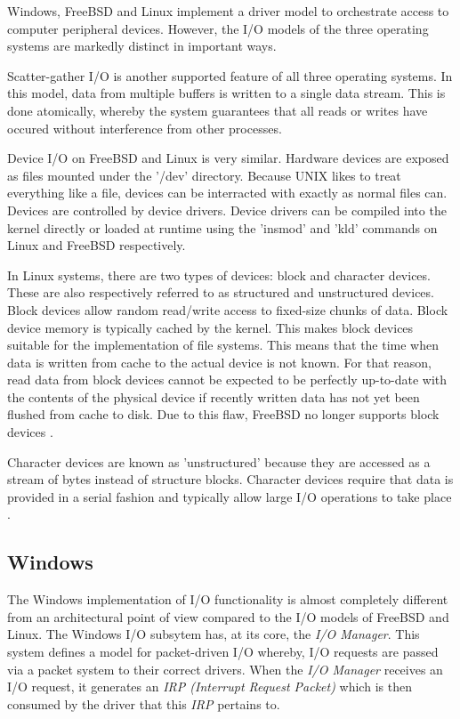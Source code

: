 \documentclass[onecolumn,10pt]{IEEETran}
\begin{document}
Windows, FreeBSD and Linux implement a driver model to orchestrate access to computer peripheral devices.  However, the I/O models of the three operating systems are markedly distinct in important ways.

	Scatter-gather I/O is another supported feature of all three operating systems.  In this model, data from multiple buffers is written to a single data stream.  This is done atomically, whereby the system guarantees that all reads or writes have occured without interference from other processes. 

Device I/O on FreeBSD and Linux is very similar.  Hardware devices are exposed as files mounted under the '/dev' directory.  Because UNIX likes to treat everything like a file, devices can be interracted with exactly as normal files can.  Devices are controlled by device drivers.  Device drivers can be compiled into the kernel directly or loaded at runtime using the 'insmod' and 'kld' commands on Linux and FreeBSD respectively.

In Linux systems, there are two types of devices: block and character devices.  These are also respectively referred to as structured and unstructured devices.  Block devices allow random read/write access to fixed-size chunks of data.  Block device memory is typically cached by the kernel.  This makes block devices suitable for the implementation of file systems.  This means that the time when data is written from cache to the actual device is not known.  For that reason, read data from block devices cannot be expected to be perfectly up-to-date with the contents of the physical device if recently written data has not yet been flushed from cache to disk.  Due to this flaw, FreeBSD no longer supports block devices \cite{freebsd-proc}.

  Character devices are known as 'unstructured' because they are accessed as a stream of bytes instead of structure blocks.  Character devices require that data is provided in a serial fashion and typically allow large I/O operations to take place \cite{lkd}.

\subsection{Windows}

  The Windows implementation of I/O functionality is almost completely different from an architectural point of view compared to the I/O models of FreeBSD and Linux. The Windows I/O subsytem has, at its core, the \textit{I/O Manager}.  This system defines a model for packet-driven I/O whereby, I/O requests are passed via a packet system to their correct drivers.  When the \textit{I/O Manager} receives an I/O request, it generates an \textit{IRP (Interrupt Request Packet)} which is then consumed by the driver that this \textit{IRP} pertains to.
\end{document}
